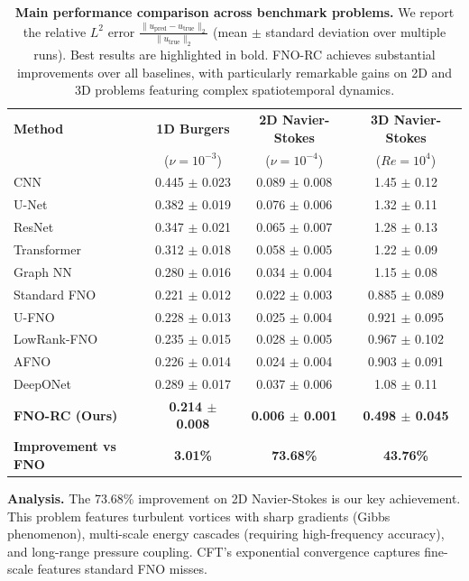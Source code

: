 \documentclass[11pt]{article}
\begin{document}
\begin{table}[h]
\centering
\caption{\textbf{Main performance comparison across benchmark problems.} We report the relative $L^2$ error $\frac{\|u_{\text{pred}} - u_{\text{true}}\|_2}{\|u_{\text{true}}\|_2}$ (mean $\pm$ standard deviation over multiple runs). Best results are highlighted in bold. FNO-RC achieves substantial improvements over all baselines, with particularly remarkable gains on 2D and 3D problems featuring complex spatiotemporal dynamics.}
\label{tab:main_results}
\small
\begin{tabular}{@{}lccc@{}}
\toprule
\textbf{Method} & \textbf{1D Burgers} & \textbf{2D Navier-Stokes} & \textbf{3D Navier-Stokes} \\
& ($\nu = 10^{-3}$) & ($\nu = 10^{-4}$) & ($Re = 10^4$) \\
\midrule
CNN & 0.445 $\pm$ 0.023 & 0.089 $\pm$ 0.008 & 1.45 $\pm$ 0.12 \\
U-Net & 0.382 $\pm$ 0.019 & 0.076 $\pm$ 0.006 & 1.32 $\pm$ 0.11 \\
ResNet & 0.347 $\pm$ 0.021 & 0.065 $\pm$ 0.007 & 1.28 $\pm$ 0.13 \\
Transformer & 0.312 $\pm$ 0.018 & 0.058 $\pm$ 0.005 & 1.22 $\pm$ 0.09 \\
Graph NN & 0.280 $\pm$ 0.016 & 0.034 $\pm$ 0.004 & 1.15 $\pm$ 0.08 \\
\midrule
Standard FNO & 0.221 $\pm$ 0.012 & 0.022 $\pm$ 0.003 & 0.885 $\pm$ 0.089 \\
U-FNO & 0.228 $\pm$ 0.013 & 0.025 $\pm$ 0.004 & 0.921 $\pm$ 0.095 \\
LowRank-FNO & 0.235 $\pm$ 0.015 & 0.028 $\pm$ 0.005 & 0.967 $\pm$ 0.102 \\
AFNO & 0.226 $\pm$ 0.014 & 0.024 $\pm$ 0.004 & 0.903 $\pm$ 0.091 \\
DeepONet & 0.289 $\pm$ 0.017 & 0.037 $\pm$ 0.006 & 1.08 $\pm$ 0.11 \\
\midrule
\textbf{FNO-RC (Ours)} & \textbf{0.214 $\pm$ 0.008} & \textbf{0.006 $\pm$ 0.001} & \textbf{0.498 $\pm$ 0.045} \\
\midrule
\textbf{Improvement vs FNO} & \textbf{3.01\%} & \textbf{73.68\%} & \textbf{43.76\%} \\
\bottomrule
\end{tabular}
\end{table}

\textbf{Analysis.} The 73.68\% improvement on 2D Navier-Stokes is our key achievement. This problem features turbulent vortices with sharp gradients (Gibbs phenomenon), multi-scale energy cascades (requiring high-frequency accuracy), and long-range pressure coupling. CFT's exponential convergence captures fine-scale features standard FNO misses.
\end{document}
